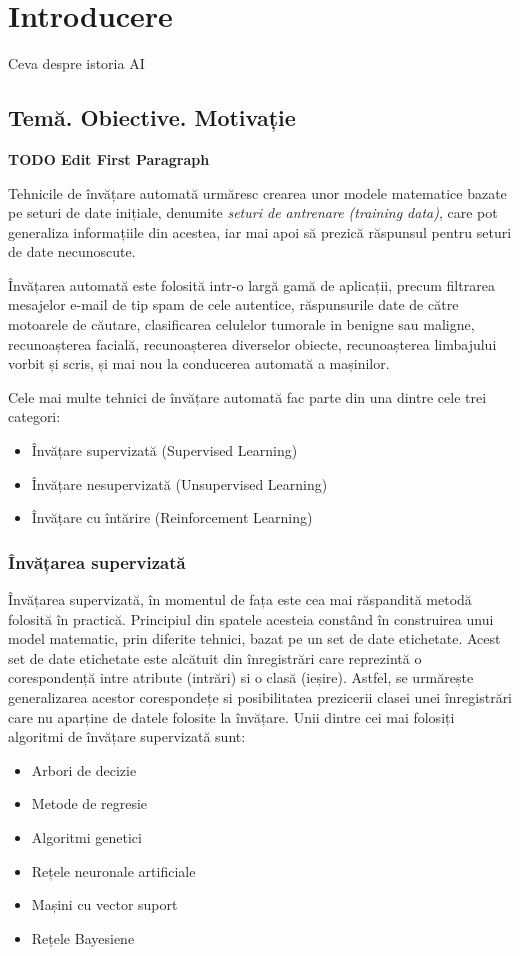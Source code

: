 \chapter{Introducere}\label{ch:1intro}
Ceva despre istoria AI
\section{Temă. Obiective. Motivație}
\textbf{TODO Edit First Paragraph}

Tehnicile de învățare automată urmăresc crearea unor modele matematice bazate pe seturi de date inițiale, denumite \textit{seturi de antrenare (training data)}, care pot generaliza informațiile din acestea, iar mai apoi să prezică răspunsul pentru seturi de date necunoscute.

Învățarea automată este folosită intr-o largă gamă de aplicații, precum filtrarea mesajelor e-mail de tip spam de cele autentice, răspunsurile date de către motoarele de căutare, clasificarea celulelor tumorale in benigne sau maligne, recunoașterea facială, recunoașterea diverselor obiecte, recunoașterea limbajului vorbit și scris, și mai nou la conducerea automată a mașinilor. 

Cele mai multe tehnici de învățare automată fac parte din una dintre cele trei categori:
\begin{itemize}
	\item Învățare supervizată (Supervised Learning)
	\item Învățare nesupervizată (Unsupervised Learning)
	\item Învățare cu întărire (Reinforcement Learning)
\end{itemize}

\subsection*{Învățarea supervizată}
Învățarea supervizată, în momentul de fața este cea mai răspandită metodă folosită în practică. Principiul din spatele acesteia constând în construirea unui model matematic, prin diferite tehnici, bazat pe un set de date etichetate. Acest set de date etichetate este alcătuit din înregistrări care reprezintă o corespondență intre atribute (intrări) si o clasă (ieșire). Astfel, se urmărește generalizarea acestor corespondețe si posibilitatea prezicerii clasei unei înregistrări care nu aparține de datele folosite la învățare. Unii dintre cei mai folosiți algoritmi de învățare supervizată sunt:
\begin{itemize}
	\item Arbori de decizie
	\item Metode de regresie
	\item Algoritmi genetici
	\item Rețele neuronale artificiale
	\item Mașini cu vector suport
	\item Rețele Bayesiene
\end{itemize}

